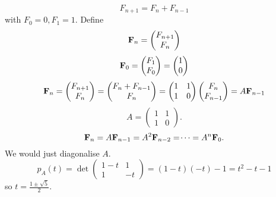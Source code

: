 \documentclass[10pt, a4paper]{article}
\begin{document}
\begin{problem}
    \[
    F_{n + 1} = F_n + F_{n - 1}
    \]
    with $F_0 = 0, F_1 = 1$.
    Define
    \[
    \mathbf{F}_n = \begin{pmatrix}
        F_{n + 1} \\ F_n
    \end{pmatrix}
    \]
    \[
    \mathbf{F}_0 = \begin{pmatrix}
        F_1 \\ F_0
    \end{pmatrix} = \begin{pmatrix}
        1 \\ 0
    \end{pmatrix}
    \]
    \[
    \mathbf{F}_n = \begin{pmatrix}
        F_{n + 1} \\ F_n
    \end{pmatrix} = \begin{pmatrix}
        F_n + F_{n - 1} \\ F_n
    \end{pmatrix} = \begin{pmatrix}
        1 & 1 \\ 1 & 0
    \end{pmatrix}\begin{pmatrix}
        F_n \\ F_{n - 1}
    \end{pmatrix} = A\mathbf{F}_{n - 1}
    \]
    \[
    A = \begin{pmatrix}
        1 & 1 \\ 1 & 0
    \end{pmatrix}.
    \]
    \[
    \mathbf{F}_n = A\mathbf{F}_{n - 1} = A ^ 2\mathbf{F}_{n - 2} = \dotsi = A ^ n\mathbf{F}_0.
    \]
    We would just diagonalise $A$.
    \[
    p_A(t) = \det\begin{pmatrix}
        1 - t & 1 \\ 1 & -t
    \end{pmatrix} = (1 - t)(-t) - 1 = t ^ 2 - t - 1
    \]
    so $t = \frac{1 \pm \sqrt{5}}{2}$.
\end{problem}
\end{document}
